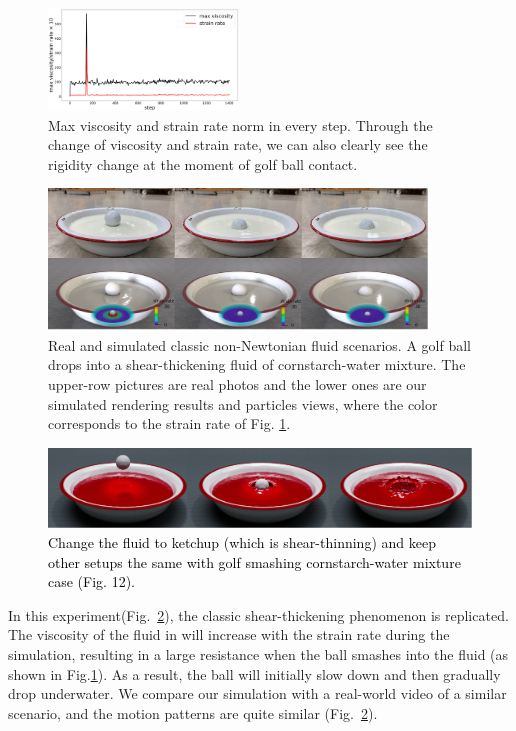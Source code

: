 \documentclass[10pt,journal,compsoc]{IEEEtran}
\newcommand{\revised}[1]{{\textcolor{black}{#1}}}
\begin{document}
\begin{figure}[htbp]
	\includegraphics[width=0.45\textwidth]{pics/maxviscoandstrainrate.png}
	\caption{Max viscosity and strain rate norm in every step. Through the change of viscosity and strain rate, we can also clearly see the rigidity change at the moment of golf ball contact.
	}     \label{fig:dropline}
\end{figure}

\begin{figure}[htbp]
	\centering
	\includegraphics[width=0.9\textwidth]{pics/golf-vs-real.png}
	\caption{Real and simulated classic non-Newtonian fluid scenarios. A golf ball drops into a shear-thickening fluid of cornstarch-water mixture. The upper-row pictures are real photos and the lower ones are our simulated rendering results and particles views, where the color corresponds to the strain rate of Fig. \ref{fig:dropline}. }  \label{fig:realworld}
\end{figure}

\begin{figure}[htbp]
	\centering
	\includegraphics[width=.9\textwidth]{pics/ketchup.png}
	\caption{\revised{Change the fluid to ketchup (which is shear-thinning) and keep other setups the same with golf smashing cornstarch-water mixture case (Fig. 12).}} \label{fig:ketchup}
\end{figure}

In this experiment(Fig.~\ref{fig:realworld}), the classic shear-thickening phenomenon is replicated. The viscosity of the fluid in  will increase with the strain rate during the simulation, resulting in a large resistance when the ball smashes into the fluid (as shown in Fig.\ref{fig:dropline}). As a result, the ball will initially slow down and then gradually drop underwater. We compare our simulation with a real-world video of a similar scenario, and the motion patterns are quite similar (Fig.~\ref{fig:realworld}).
\end{document}
